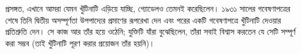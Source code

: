 \documentclass[../../../include/open-logic-section]{subfiles}
\begin{document}
\begin{digress}
প্রসঙ্গত, এখানে আমরা যেমন খুঁটিনাটি এড়িয়ে যাচ্ছি, গ্যোডেলও তেমনই
করেছিলেন। ১৯৩১ সালের গবেষণাপত্রের শেষে তিনি দ্বিতীয় অসম্পূর্ণতা
উপপাদ্যের প্রমাণের রূপরেখা দেন এবং পরের একটি গবেষণাপত্রে খুঁটিনাটি দেওয়ার
প্রতিশ্রুতি দেন। সে কাজ আর তাঁর হয়ে ওঠেনি; যুক্তিটি যাঁরা বুঝেছিলেন,
তাঁরা সবাই বিশ্বাস করতেন যে সেটি সম্পূর্ণ করা সম্ভব (তাই খুঁটিনাটি পূরণ
করার প্রয়োজন তাঁর হয়নি)।
\end{digress}
\end{document}
